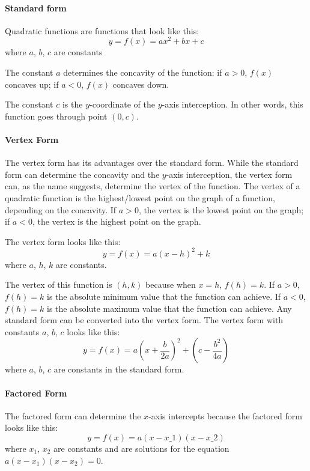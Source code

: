\paragraph{Standard form}

Quadratic functions are functions that look like this:
$$
y = f(x) = ax^2 + bx + c
$$
where $a$, $b$, $c$ are constants

The constant $a$ determines the concavity of the function: if $a > 0$, $f(x)$ concaves up; if $a < 0$, $f(x)$ concaves down.

The constant $c$ is the $y$-coordinate of the $y$-axis interception. In other words, this function goes through point $(0, c)$.

\paragraph{Vertex Form}

The vertex form has its advantages over the standard form. While the standard form can determine the concavity and the $y$-axis interception, the vertex form can, as the name suggests, determine the vertex of the function. The vertex of a quadratic function is the highest/lowest point on the graph of a function, depending on the concavity. If $a > 0$, the vertex is the lowest point on the graph; if $a < 0$, the vertex is the highest point on the graph.

The vertex form looks like this:
$$
y = f(x) = a(x - h)^2 + k
$$
where $a$, $h$, $k$ are constants.

The vertex of this function is $(h, k)$ because when $x = h$, $f(h) = k$. If $a > 0$, $f(h) = k$ is the absolute minimum value that the function can achieve. If $a < 0$, $f(h) = k$ is the absolute maximum value that the function can achieve. Any standard form can be converted into the vertex form. The vertex form with constants $a$, $b$, $c$ looks like this:
$$
y = f(x) = a \left(x + \frac{b}{2a}\right)^2 + \left(c - \frac{b^2}{4a}\right)
$$
where $a$, $b$, $c$ are constants in the standard form.

\paragraph{Factored Form}

The factored form can determine the $x$-axis intercepts because the factored form looks like this:
$$
y = f(x) = a(x - x\_1)(x - x\_2)
$$
where $x_1$, $x_2$ are constants and are solutions for the equation $a(x - x_1)(x - x_2) = 0$.

